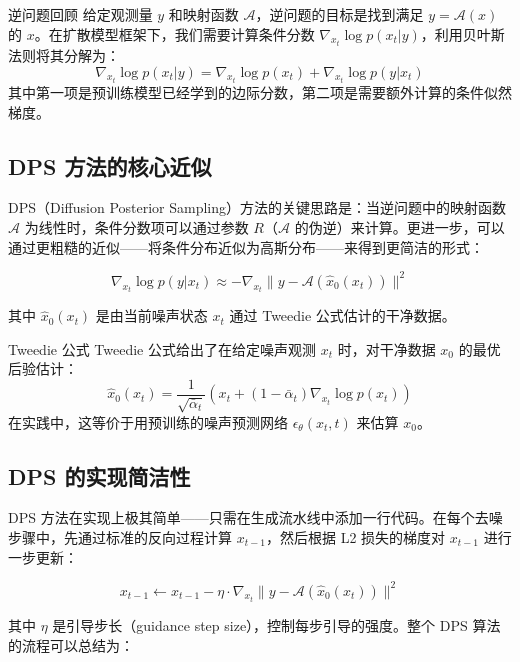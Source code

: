 \documentclass[a4paper]{article}
\begin{document}
\begin{importantbox}{逆问题回顾}
给定观测量 $y$ 和映射函数 $\mathcal{A}$，逆问题的目标是找到满足 $y = \mathcal{A}(x)$ 的 $x$。在扩散模型框架下，我们需要计算条件分数 $\nabla_{x_t} \log p(x_t | y)$，利用贝叶斯法则将其分解为：
$$\nabla_{x_t} \log p(x_t | y) = \nabla_{x_t} \log p(x_t) + \nabla_{x_t} \log p(y | x_t)$$
其中第一项是预训练模型已经学到的边际分数，第二项是需要额外计算的条件似然梯度。
\end{importantbox}

\subsection{DPS 方法的核心近似}

DPS（Diffusion Posterior Sampling）方法的关键思路是：当逆问题中的映射函数 $\mathcal{A}$ 为线性时，条件分数项可以通过参数 $R$（$\mathcal{A}$ 的伪逆）来计算。更进一步，可以通过更粗糙的近似——将条件分布近似为高斯分布——来得到更简洁的形式：

$$\nabla_{x_t} \log p(y | x_t) \approx -\nabla_{x_t} \| y - \mathcal{A}(\hat{x}_0(x_t)) \|^2$$

其中 $\hat{x}_0(x_t)$ 是由当前噪声状态 $x_t$ 通过 Tweedie 公式估计的干净数据。

\begin{knowledgebox}{Tweedie 公式}
Tweedie 公式给出了在给定噪声观测 $x_t$ 时，对干净数据 $x_0$ 的最优后验估计：
$$\hat{x}_0(x_t) = \frac{1}{\sqrt{\bar{\alpha}_t}} \left( x_t + (1 - \bar{\alpha}_t) \nabla_{x_t} \log p(x_t) \right)$$
在实践中，这等价于用预训练的噪声预测网络 $\epsilon_\theta(x_t, t)$ 来估算 $x_0$。
\end{knowledgebox}

\subsection{DPS 的实现简洁性}

DPS 方法在实现上极其简单——只需在生成流水线中添加一行代码。在每个去噪步骤中，先通过标准的反向过程计算 $x_{t-1}$，然后根据 L2 损失的梯度对 $x_{t-1}$ 进行一步更新：

$$x_{t-1} \leftarrow x_{t-1} - \eta \cdot \nabla_{x_t} \| y - \mathcal{A}(\hat{x}_0(x_t)) \|^2$$

其中 $\eta$ 是引导步长（guidance step size），控制每步引导的强度。整个 DPS 算法的流程可以总结为：
\end{document}
